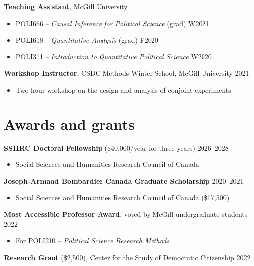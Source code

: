 \documentclass[margin, 10pt]{res}
\begin{document}
\begin{resume}
\textbf{Teaching Assistant}, McGill University
\begin{itemize}
	\item POLI666 -- \textit{Causal Inference for Political Science} (grad) \hspace*{0pt}\hfill W2021
	\item POLI618 -- \textit{Quantitative Analysis} (grad) \hspace*{0pt}\hfill F2020
	\item POLI311 -- \textit{Introduction to Quantitative Political Science} \hspace*{0pt}\hfill W2020
\end{itemize}

\textbf{Workshop Instructor}, CSDC Methods Winter School, McGill University \hspace*{0pt}\hfill 2021
\begin{itemize}
	\item Two-hour workshop on the design and analysis of conjoint experiments
\end{itemize}

\section{Awards and grants}

\textbf{SSHRC Doctoral Fellowship} (\$40,000/year for three years) \hspace*{0pt}\hfill 2026--2028
\begin{itemize}
	\item Social Sciences and Humanities Research Council of Canada
\end{itemize}

\textbf{Joseph-Armand Bombardier Canada Graduate Scholarship} \hspace*{0pt}\hfill 2020--2021
\begin{itemize}
	\item Social Sciences and Humanities Research Council of Canada (\$17,500)
\end{itemize}

\textbf{Most Accessible Professor Award}, voted by McGill undergraduate students \hspace*{0pt}\hfill 2022
\begin{itemize}
	\item For POLI210 -- \textit{Political Science Research Methods}
\end{itemize}

\textbf{Research Grant} (\$2,500), Center for the Study of Democratic Citizenship \hspace*{0pt}\hfill 2022


\end{resume}
\end{document}
